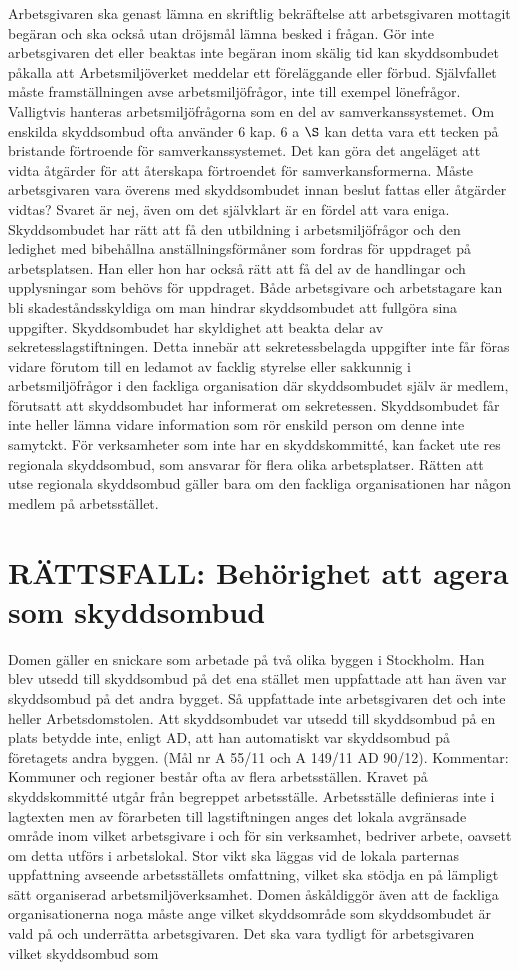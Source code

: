 Arbetsgivaren ska genast lämna en skriftlig bekräftelse att arbetsgivaren mottagit begäran och ska också utan dröjsmål lämna besked i frågan. Gör inte arbetsgivaren det eller beaktas inte begäran inom skälig tid kan skyddsombudet påkalla att Arbetsmiljöverket meddelar ett föreläggande eller förbud. Självfallet måste framställningen avse arbetsmiljöfrågor, inte till exempel lönefrågor. Valligtvis hanteras arbetsmiljöfrågorna som en del av samverkanssystemet. Om enskilda skyddsombud ofta använder 6 kap. 6 a \(\S\) kan detta vara ett tecken på bristande förtroende för samverkanssystemet. Det kan göra det angeläget att vidta åtgärder för att återskapa förtroendet för samverkansformerna.
Måste arbetsgivaren vara överens med skyddsombudet innan beslut fattas eller åtgärder vidtas? Svaret är nej, även om det självklart är en fördel att vara eniga.
Skyddsombudet har rätt att få den utbildning i arbetsmiljöfrågor och den ledighet med bibehållna anställningsförmåner som fordras för uppdraget på arbetsplatsen. Han eller hon har också rätt att få del av de handlingar och upplysningar som behövs för uppdraget. Både arbetsgivare och arbetstagare kan bli skadeståndsskyldiga om man hindrar skyddsombudet att fullgöra sina uppgifter.
Skyddsombudet har skyldighet att beakta delar av sekretesslagstiftningen. Detta innebär att sekretessbelagda uppgifter inte får föras vidare förutom till en ledamot av facklig styrelse eller sakkunnig i arbetsmiljöfrågor i den fackliga organisation där skyddsombudet själv är medlem, förutsatt att skyddsombudet har informerat om sekretessen. Skyddsombudet får inte heller lämna vidare information som rör enskild person om denne inte samytckt.
För verksamheter som inte har en skyddskommitté, kan facket ute res regionala skyddsombud, som ansvarar för flera olika arbetsplatser. Rätten att utse regionala skyddsombud gäller bara om den fackliga organisationen har någon medlem på arbetsstället.
\section*{RÄTTSFALL: Behörighet att agera som skyddsombud}
Domen gäller en snickare som arbetade på två olika byggen i Stockholm. Han blev utsedd till skyddsombud på det ena stället men uppfattade att han även var skyddsombud på det andra bygget. Så uppfattade inte arbetsgivaren det och inte heller Arbetsdomstolen. Att skyddsombudet var utsedd till skyddsombud på en plats betydde inte, enligt AD, att han automatiskt var skyddsombud på företagets andra byggen. (Mål nr A 55/11 och A 149/11 AD 90/12).
Kommentar: Kommuner och regioner består ofta av flera arbetsställen. Kravet på skyddskommitté utgår från begreppet arbetsställe. Arbetsställe definieras inte i lagtexten men av förarbeten till lagstiftningen anges det lokala avgränsade område inom vilket arbetsgivare i och för sin verksamhet, bedriver arbete, oavsett om detta utförs i arbetslokal. Stor vikt ska läggas vid de lokala parternas uppfattning avseende arbetsställets omfattning, vilket ska stödja en på lämpligt sätt organiserad arbetsmiljöverksamhet.
Domen åskåldiggör även att de fackliga organisationerna noga måste ange vilket skyddsområde som skyddsombudet är vald på och underrätta arbetsgivaren. Det ska vara tydligt för arbetsgivaren vilket skyddsombud som

